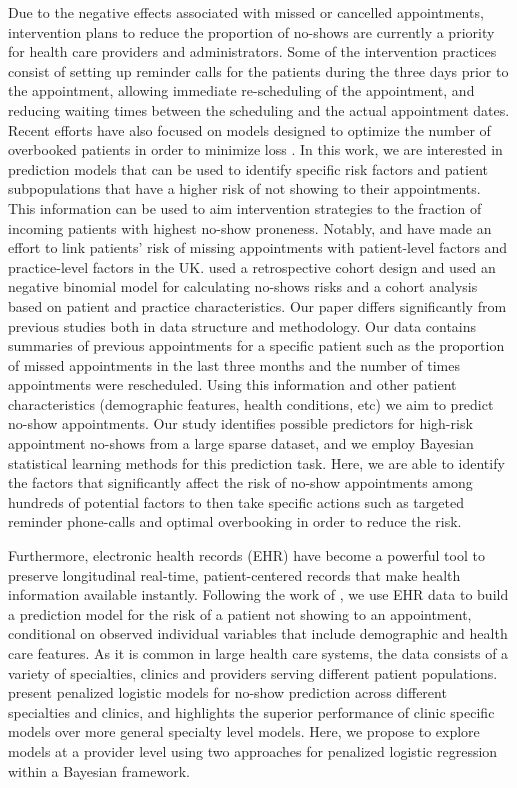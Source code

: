 \documentclass[twoside,11pt]{article}
\begin{document}
Due to the negative effects associated with missed or cancelled appointments, intervention plans to reduce the proportion of no-shows are currently a priority for health care providers and administrators. Some of the intervention practices consist of setting up reminder calls for the patients during the three days prior to the appointment, allowing immediate re-scheduling of the appointment, and reducing waiting times between the scheduling and the actual appointment dates. Recent efforts have also focused on models designed to optimize the number of overbooked patients in order to minimize loss \citep{ElSharo15}.  In this work, we are interested in prediction models that can be used to identify specific risk factors and patient subpopulations that have a higher risk of not showing to their appointments. This information can be used to aim intervention strategies to the fraction of incoming patients with highest no-show proneness. {\color{red} Notably, \cite{Williamson17} and \cite{Ellis17} have made an effort to link patients' risk of missing appointments with patient-level factors and practice-level factors in the UK.  \cite{Williamson17} used a retrospective cohort design and \cite{Ellis17} used an negative binomial model for calculating no-shows risks and a cohort analysis based on patient and practice characteristics. Our paper differs significantly from previous studies both in data structure and methodology. Our data contains summaries of previous appointments for a specific patient such as the proportion of missed appointments in the last three months and the number of times appointments were rescheduled. Using this information and other patient characteristics (demographic features, health conditions, etc) we aim to predict no-show appointments. Our study identifies possible predictors for high-risk appointment no-shows from a large sparse dataset, and we employ Bayesian statistical learning methods for this prediction task.  Here, we are able to identify the factors that significantly affect the risk of no-show appointments among hundreds of potential factors to then take specific actions such as targeted reminder phone-calls and optimal overbooking in order to reduce the risk. }

Furthermore, electronic health records (EHR) have become a powerful tool to preserve longitudinal real-time, patient-centered records that make health information available instantly. Following the work of \cite{Ben18}, we use EHR data to build a prediction model for the risk of a patient not showing to an appointment, conditional on observed individual variables that include demographic and health care features. As it is common in large health care systems, the data consists of a variety of specialties, clinics and providers serving different patient populations. \cite{Ben18} present penalized logistic models for no-show prediction across different specialties and clinics, and highlights the superior performance of clinic specific models over more general specialty level models. Here, we propose to explore models at a provider level using two approaches for penalized logistic regression within a Bayesian framework.
\end{document}
